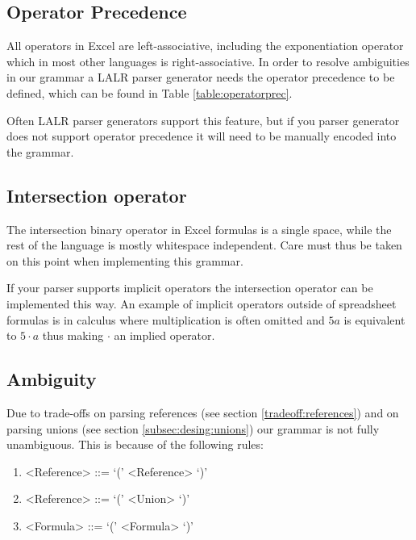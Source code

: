 \documentclass[conference]{IEEEtran}
\begin{document}
\subsection{Operator Precedence}

All operators in Excel are left-associative, including the exponentiation operator which in most other languages is right-associative.
In order to resolve ambiguities in our grammar a LALR parser generator needs the operator precedence to be defined, which can be found in Table \ref{table:operatorprec}.

Often LALR parser generators support this feature, but if you parser generator does not support operator precedence it will need to be manually encoded into the grammar.

\subsection{Intersection operator}

The intersection binary operator in Excel formulas is a single space, while the rest of the language is mostly whitespace independent.
Care must thus be taken on this point when implementing this grammar.

If your parser supports implicit operators the intersection operator can be implemented this way.
An example of implicit operators outside of spreadsheet formulas is in calculus where multiplication is often omitted and $5a$ is equivalent to $5 \cdot a$ thus making $\cdot$ an implied operator.

\subsection{Ambiguity}

Due to trade-offs on parsing references (see section \ref{tradeoff:references}) and on parsing unions (see section \ref{subsec:desing:unions}) our grammar is not fully unambiguous.
This is because of the following rules:
\begin{enumerate}
\item \begin{grammar}<Reference> ::= `(' <Reference> `)'\end{grammar}
\item \begin{grammar}<Reference> ::= `(' <Union> `)'\end{grammar}
\item \begin{grammar}<Formula> ::= `(' <Formula> `)'\end{grammar}
\end{enumerate}
\end{document}
